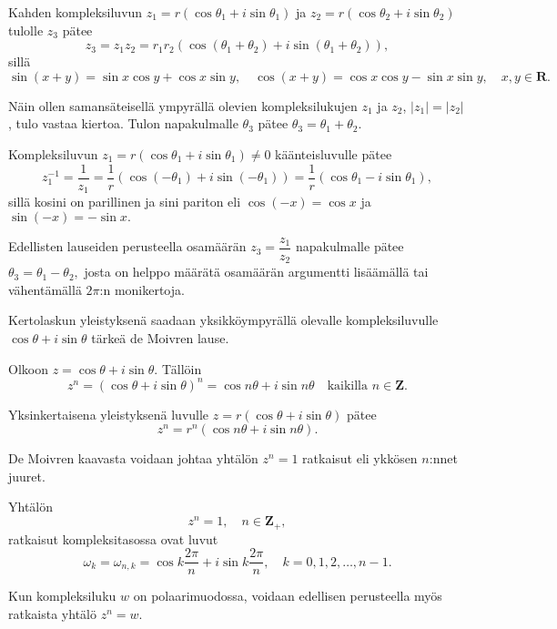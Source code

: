 \documentclass[a4paper, 12pt]{article}
\theoremstyle{remark}
\theoremstyle{definition}
\newcommand{\abs}[1]{\lvert#1\rvert}
\begin{document}
\begin{lause} Kahden kompleksiluvun $z_1=r(\cos\theta_1+i\sin\theta_1)$ ja $z_2=r(\cos\theta_2+i\sin\theta_2)$ tulolle $z_3$ pätee
$$
z_3=z_1z_2=r_1r_2\left(\cos(\theta_1+\theta_2)+i\sin(\theta_1+\theta_2)\right),
$$
sillä
$$
\sin(x+y)=\sin x \cos y+\cos x\sin y,\quad \cos(x+y)=\cos x \cos y -\sin x\sin y,\quad x,y\in\mathbf{R}.
$$
\end{lause}

Näin ollen samansäteisellä ympyrällä olevien kompleksilukujen $z_1$ ja $z_2$, $\abs{z_1}=\abs{z_2}$, tulo vastaa kiertoa. Tulon napakulmalle $\theta_3$ pätee $\theta_3=\theta_1+\theta_2.$

\begin{lause} Kompleksiluvun $z_1=r(\cos\theta_1+i\sin \theta_1)\neq 0$ käänteisluvulle pätee
$$
z_1^{-1}=\frac{1}{z_1}=\frac{1}{r}\left(\cos (-\theta_1)+i\sin(-\theta_1)\right)=\frac{1}{r}\left(\cos \theta_1-i\sin\theta_1\right),
$$
sillä kosini on parillinen ja sini pariton eli $\cos(-x)=\cos x$ ja $\sin(-x)=-\sin x.$
\end{lause}

Edellisten lauseiden perusteella osamäärän $z_3=\dfrac{z_1}{z_2}$ napakulmalle pätee
$\theta_3=\theta_1-\theta_2,$ josta on helppo määrätä osamäärän argumentti lisäämällä tai vähentämällä $2\pi$:n monikertoja.

Kertolaskun yleistyksenä saadaan yksikköympyrällä olevalle kompleksiluvulle $\cos \theta+i\sin\theta$ tärkeä de Moivren lause.

\begin{lause}[De Moivre] Olkoon $z=\cos \theta+i\sin \theta.$ Tällöin
$$
z^n=\left(\cos \theta+i\sin \theta\right)^n=\cos n\theta+i\sin n\theta\quad\text{kaikilla } n\in\mathbf{Z}.
$$
\end{lause}

Yksinkertaisena yleistyksenä luvulle $z=r(\cos \theta+i\sin \theta)$ pätee
$$
z^n=r^n\left(\cos n\theta+i\sin n\theta\right).
$$

De Moivren kaavasta voidaan johtaa yhtälön $z^n=1$ ratkaisut eli ykkösen $n$:nnet juuret.
\begin{lause}
Yhtälön 
$$
z^n=1, \quad n\in\mathbf{Z}_+,
$$
ratkaisut kompleksitasossa ovat luvut
$$
\omega_k=\omega_{n, k} =\cos k\frac{2\pi}{n}+i\sin k \frac{2\pi}{n},\quad k=0,1,2,\ldots, n-1.
$$
\end{lause}

Kun kompleksiluku $w$ on polaarimuodossa, voidaan edellisen perusteella myös ratkaista yhtälö $z^n=w$. 
\end{document}
